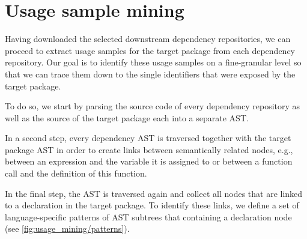 \section{Usage sample mining}
\label{sec:usage_mining}

\begin{figure*}
	\newcommand\lowlight[1]{\textcolor{gray}{#1}}
	\newcommand\highlight[1]{\textcolor{red}{#1}}
	\centering
	\begin{subfigure}[t]{.32\linewidth}
		
	\end{subfigure}
	\hfill
	\begin{subfigure}[t]{.32\linewidth}
		
	\end{subfigure}
	\hfill
	\begin{subfigure}[t]{.32\linewidth}
		
	\end{subfigure}

	\caption{AST patterns for example JavaScript/TypeScript expressions.
		The \highlight{highlighted} node contains the link to the declaration of the referenced identifier.
	}
	\label{fig:usage_mining/patterns}
\end{figure*}


Having downloaded the selected downstream dependency repositories, we can proceed to extract usage samples for the target package from each dependency repository.
Our goal is to identify these usage samples on a fine-granular level so that we can trace them down to the single identifiers that were exposed by the target package.

To do so, we start by parsing the source code of every dependency repository as well as the source of the target package each into a separate AST.

In a second step, every dependency AST is traversed together with the target package AST in order to create links between semantically related nodes, e.g., between an expression and the variable it is assigned to or between a function call and the definition of this function.

In the final step, the AST is traversed again and collect all nodes that are linked to a declaration in the target package.
To identify these links, we define a set of language-specific patterns of AST subtrees that containing a declaration node (see \cref{fig:usage_mining/patterns}).
